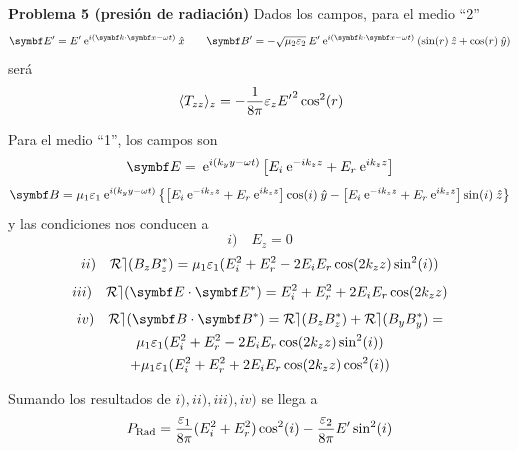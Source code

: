 \documentclass[10pt,oneside]{CBFT_book}
\begin{document}
\begin{ejemplo}{\bf Problema 5 (presión de radiación)}
Dados los campos, para el medio ``2''
\[
	\vb{E}'= E' \euler^{i ( \pe{k}{x} - \omega t)} \xver
	\qquad 
	\vb{B}'= - \sqrt{ \mu_2\vare_2 } \: E' \euler^{i ( \pe{k}{x} - \omega t)} 
	\: ( \sin(r)\zver + \cos(r)\yver )
\]
será
\[
	\:\langle T_{zz} \rangle_z = - \frac{1}{8\pi} \varepsilon_z {E'}^2 \cos^2(r)
\]

Para el medio ``1'', los campos son
\[
	\vb{E} = \euler^{i ( k_y y - \omega t)} 
	\left[ E_i \euler^{ -i k_z z } + E_r \euler^{ i k_z z } \right]
\]
\[
	\vb{B} = \mu_1\vare_1 \euler^{i ( k_y y - \omega t)}
	\left\{ 
	 \left[ E_i \euler^{ -i k_z z } + E_r \euler^{ i k_z z } \right] \cos(i) \yver -
	\left[ E_i \euler^{ -i k_z z } + E_r \euler^{ i k_z z } \right] \sin(i) \zver
	\right\}
\]
y las condiciones nos conducen a
\[
	i) \quad E_z = 0
\]
\[
	ii) \quad \mathcal{Re}( B_z B_z^*) =
	\mu_1\varepsilon_1( E_i^2 + E_r^2 - 2 E_i E_r \cos( 2 k_z z) \sin^2( i ) )
\]
\[
	iii) \quad \mathcal{Re}( \vb{E}\cdot\vb{E}^*) = 
	E_i^2 + E_r^2 + 2 E_i E_r \cos( 2 k_z z)
\]
\begin{multline*}
	iv) \quad \mathcal{Re}( \vb{B}\cdot\vb{B}^*) =
	\mathcal{Re}( B_z B_z^*) + \mathcal{Re}( B_y B_y^*) = \\
	\mu_1\vare_1( E_i^2 + E_r^2 - 2 E_i E_r \cos( 2 k_z z) \sin^2( i ) ) \\
	+ \mu_1\vare_1( E_i^2 + E_r^2 + 2 E_i E_r \cos( 2 k_z z) \cos^2( i ) ) 
\end{multline*}

Sumando los resultados de $i),ii), iii), iv)$ se llega a
\[
	P_{\text{Rad}} = \frac{\varepsilon_1}{8\pi}(E_i^2 + E_r^2) \cos^2(i) - \frac{\varepsilon_2}{8\pi} E' \sin^2(i)
\]
 
\end{ejemplo}



\end{document}
